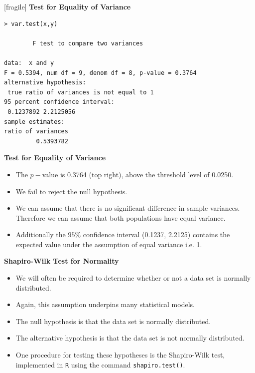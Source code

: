 \documentclass[a4]{beamer}
\begin{document}
[fragile]
\noindent \textbf{Test for Equality of Variance}
\begin{verbatim}
> var.test(x,y)

        F test to compare two variances

data:  x and y
F = 0.5394, num df = 9, denom df = 8, p-value = 0.3764
alternative hypothesis: 
 true ratio of variances is not equal to 1
95 percent confidence interval:
 0.1237892 2.2125056
sample estimates:
ratio of variances
         0.5393782
\end{verbatim}




\noindent \textbf{Test for Equality of Variance}
\begin{itemize}
\item The $p-$value is 0.3764 (top right), above the threshold level of 0.0250.
\item We fail to reject the null hypothesis.
\item We can assume that there is no significant difference in sample variances. Therefore we can assume that both populations have equal variance.
\item Additionally the $95\%$ confidence interval (0.1237, 2.2125) contains the expected value under the assumption of equal variance i.e. 1.
\end{itemize}






\noindent \textbf{Shapiro-Wilk Test for Normality}


\begin{itemize}
\item We will often be required to determine whether or not a data set is normally distributed.
\item Again, this assumption underpins many statistical models.
\item The null hypothesis is that the data set is normally distributed.
\item The alternative hypothesis is that the data set is not normally distributed.
\item One procedure for testing these hypotheses is the Shapiro-Wilk test, implemented in \texttt{R} using the command \texttt{shapiro.test()}.
\end{itemize}
\end{document}
